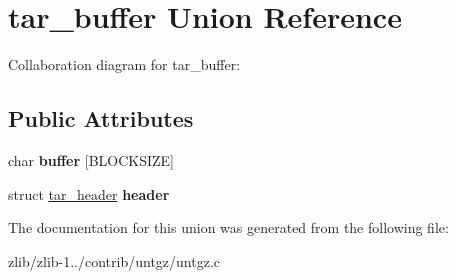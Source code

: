\hypertarget{uniontar__buffer}{\section{tar\+\_\+buffer Union Reference}
\label{uniontar__buffer}
}


Collaboration diagram for tar\+\_\+buffer\+:
\subsection*{Public Attributes}
\begin{DoxyCompactItemize}
\item 
\hypertarget{uniontar__buffer_a11ef0711365d564c85f78325a1343589}{char {\bfseries buffer} \mbox{[}B\+L\+O\+C\+K\+S\+I\+Z\+E\mbox{]}}\label{uniontar__buffer_a11ef0711365d564c85f78325a1343589}

\item 
\hypertarget{uniontar__buffer_a3454da53e731846565bf3080bdff9799}{struct \hyperlink{structtar__header}{tar\+\_\+header} {\bfseries header}}\label{uniontar__buffer_a3454da53e731846565bf3080bdff9799}

\end{DoxyCompactItemize}


The documentation for this union was generated from the following file\+:\begin{DoxyCompactItemize}
\item 
zlib/zlib-\/1../contrib/untgz/untgz.\+c\end{DoxyCompactItemize}

